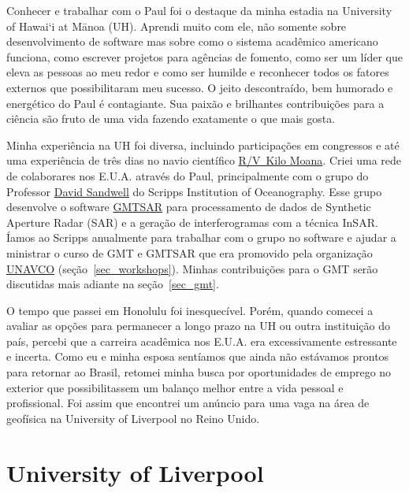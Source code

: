 \documentclass[10pt,a4paper,oneside]{book}
\newcommand{\UHM}{University of Hawai`i at M\={a}noa}
\begin{document}
Conhecer e trabalhar com o Paul foi o destaque da minha estadia na
\UHM{} (UH).
Aprendi muito com ele, não somente sobre desenvolvimento de software mas sobre
como o sistema acadêmico americano funciona, como escrever projetos para
agências de fomento, como ser um líder que eleva as pessoas ao meu redor e como
ser humilde e reconhecer todos os fatores externos que possibilitaram meu
sucesso.
O jeito descontraído, bem humorado e energético do Paul é contagiante.
Sua paixão e brilhantes contribuições para a ciência são fruto de uma vida
fazendo exatamente o que mais gosta.

Minha experiência na UH foi diversa, incluindo participações em congressos e
até uma experiência de três dias no navio científico
\href{https://www.soest.hawaii.edu/soestwp/tech/watercraft/kilo-moana/}{R/V Kilo Moana}.
Criei uma rede de colaborares nos E.U.A. através do Paul, principalmente com
o grupo do Professor \href{https://topex.ucsd.edu/sandwell/}{David Sandwell}
do Scripps Institution of Oceanography.
Esse grupo desenvolve o software \href{https://github.com/gmtsar}{GMTSAR} para
processamento de dados de Synthetic Aperture Radar (SAR) e a geração de
interferogramas com a técnica InSAR.
Íamos ao Scripps anualmente para trabalhar com o grupo no software e ajudar a
ministrar o curso de GMT e GMTSAR que era promovido pela organização
\href{https://www.unavco.org/}{UNAVCO} (seção~\ref{sec_workshops}).
Minhas contribuições para o GMT serão discutidas mais adiante na
seção~\ref{sec_gmt}.

O tempo que passei em Honolulu foi inesquecível.
Porém, quando comecei a avaliar as opções para permanecer a longo prazo na UH
ou outra instituição do país, percebi que a carreira acadêmica nos E.U.A. era
excessivamente estressante e incerta.
Como eu e minha esposa sentíamos que ainda não estávamos prontos para retornar
ao Brasil, retomei minha busca por oportunidades de emprego no exterior que
possibilitassem um balanço melhor entre a vida pessoal e profissional.
Foi assim que encontrei um anúncio para uma vaga na área de geofísica na
University of Liverpool no Reino Unido.


\section{University of Liverpool}
\label{sec_liverpool}
\end{document}
